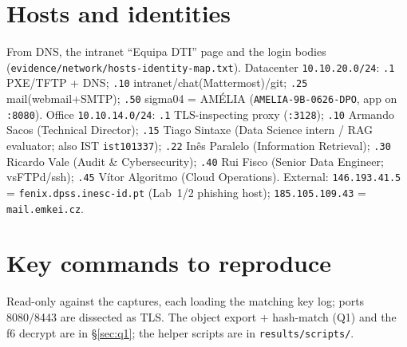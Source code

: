 \documentclass[11pt,a4paper,final,oneside]{article}
\begin{document}
\section{Hosts and identities}
\label{app:hosts}
From DNS, the intranet ``Equipa DTI'' page and the login bodies
(\texttt{evidence/network/hosts-identity-map.txt}). Datacenter
\texttt{10.10.20.0/24}: \texttt{.1} PXE/TFTP + DNS; \texttt{.10}
intranet/chat(Mattermost)/git; \texttt{.25} mail(webmail+SMTP); \texttt{.50}
sigma04 = AMÉLIA (\texttt{AMELIA-9B-0626-DPO}, app on \texttt{:8080}). Office
\texttt{10.10.14.0/24}: \texttt{.1} TLS-inspecting proxy (\texttt{:3128});
\texttt{.10} Armando Sacos (Technical Director); \texttt{.15} Tiago Sintaxe (Data
Science intern / RAG evaluator; also IST \texttt{ist101337}); \texttt{.22} Inês
Paralelo (Information Retrieval); \texttt{.30} Ricardo Vale (Audit \&
Cybersecurity); \texttt{.40} Rui Fisco (Senior Data Engineer; vsFTPd/ssh);
\texttt{.45} Vítor Algoritmo (Cloud Operations). External: \texttt{146.193.41.5}
= \texttt{fenix.dpss.inesc-id.pt} (Lab~1/2 phishing host); \texttt{185.105.109.43}
= \texttt{mail.emkei.cz}.

\section{Key commands to reproduce}
\label{app:cmds}
Read-only against the captures, each loading the matching key log; ports 8080/8443
are dissected as TLS. The object export + hash-match (Q1) and the f6 decrypt are
in §\ref{sec:q1}; the helper scripts are in \texttt{results/scripts/}.
\end{document}
